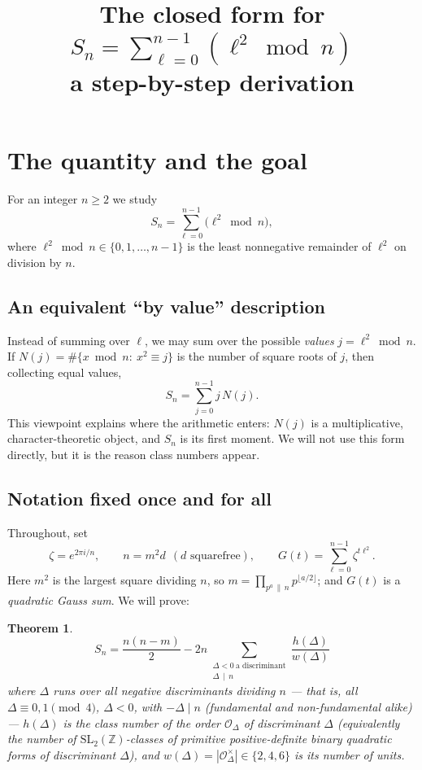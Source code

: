 \documentclass[11pt]{article}
\title{The closed form for $\displaystyle S_n=\sum_{\ell=0}^{n-1}(\ell^2\bmod n)$\\[2pt]
\large a step-by-step derivation}
\author{}
\date{}
\newtheorem{theorem}{Theorem}
\begin{document}
\maketitle

\section{The quantity and the goal}

For an integer $n\ge2$ we study
\[
S_n=\sum_{\ell=0}^{n-1}\bigl(\ell^2\bmod n\bigr),
\]
where $\ell^2\bmod n\in\{0,1,\dots,n-1\}$ is the least nonnegative remainder of $\ell^2$ on division by $n$.

\subsection{An equivalent ``by value'' description}
Instead of summing over $\ell$, we may sum over the possible \emph{values} $j=\ell^2\bmod n$. If
$N(j)=\#\{x\bmod n:\ x^2\equiv j\}$ is the number of square roots of $j$, then collecting equal values,
\[
S_n=\sum_{j=0}^{n-1} j\,N(j).
\]
This viewpoint explains where the arithmetic enters: $N(j)$ is a multiplicative, character-theoretic object,
and $S_n$ is its first moment. We will not use this form directly, but it is the reason class numbers appear.

\subsection{Notation fixed once and for all}
Throughout, set
\[
\zeta=e^{2\pi i/n},\qquad n=m^2 d\ \ (d\text{ squarefree}),\qquad
G(t)=\sum_{\ell=0}^{n-1}\zeta^{t\ell^2}.
\]
Here $m^2$ is the largest square dividing $n$, so $m=\prod_{p^a\,\|\,n}p^{\lfloor a/2\rfloor}$; and $G(t)$ is a
\emph{quadratic Gauss sum}. We will prove:

\begin{theorem}\label{thm:main}
\[
\boxed{\;S_n=\frac{n(n-m)}{2}
-2n\sum_{\substack{\Delta<0\ \text{a discriminant}\\ \Delta\,\mid\, n}}\frac{h(\Delta)}{w(\Delta)}\;}
\]
where $\Delta$ runs over all \emph{negative discriminants} dividing $n$ --- that is, all
$\Delta\equiv0,1\pmod4$, $\Delta<0$, with $-\Delta\mid n$ (fundamental and non-fundamental alike) ---
$h(\Delta)$ is the class number of the order $\mathcal{O}_\Delta$ of discriminant $\Delta$ (equivalently the
number of $\mathrm{SL}_2(\mathbb{Z})$-classes of primitive positive-definite binary quadratic forms of
discriminant $\Delta$), and $w(\Delta)=|\mathcal{O}_\Delta^\times|\in\{2,4,6\}$ is its number of units.
\end{theorem}
\end{document}
